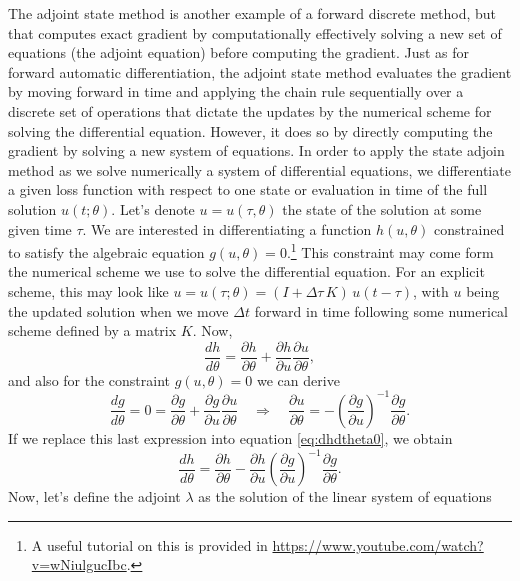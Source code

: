 The adjoint state method is another example of a forward discrete method, but that computes exact gradient by computationally effectively solving a new set of equations (the adjoint equation) before computing the gradient.
Just as for forward automatic differentiation, the adjoint state method evaluates the gradient by moving forward in time and applying the chain rule sequentially over a discrete set of operations that dictate the updates by the numerical scheme for solving the differential equation. However, it does so by directly computing the gradient by solving a new system of equations.
In order to apply the state adjoin method as we solve numerically a system of differential equations, we differentiate
a given loss function with respect to one state or evaluation in time of the full solution $u(t;\theta)$. Let's denote $u = u(\tau, \theta)$ the state of the solution at some given time $\tau$. We are interested in differentiating a function $h(u, \theta)$ constrained to satisfy the algebraic equation $g(u, \theta)=0$.\footnote{A useful tutorial on this is provided in \url{https://www.youtube.com/watch?v=wNiulgucIbc}.}
This constraint may come form the numerical scheme we use to solve the differential equation. For an explicit scheme, this may look like $u = u(\tau; \theta) = (I + \Delta \tau \, K) \, u(t - \tau)$, with $u$ being the updated solution when we move $\Delta t$ forward in time following some numerical scheme defined by a matrix $K$. Now,
\begin{equation}
 \frac{dh}{d\theta} = \frac{\partial h}{\partial \theta} + \frac{\partial h }{\partial u} \frac{\partial u}{\partial \theta},
 \label{eq:dhdtheta0}
\end{equation}
and also for the constraint $g(u, \theta)=0$ we can derive
\begin{equation}
 \frac{dg}{d\theta} = 0 = \frac{\partial g}{\partial \theta} + \frac{\partial g}{\partial u} \frac{\partial u}{\partial \theta}
 \quad \Rightarrow \quad
 \frac{\partial u}{\partial \theta} = - \left( \frac{\partial g}{\partial u} \right)^{-1} \frac{\partial g}{\partial \theta}.
\end{equation}
If we replace this last expression into equation \eqref{eq:dhdtheta0}, we obtain
\begin{equation}
 \frac{dh}{d\theta} 
 =
 \frac{\partial h}{\partial \theta} - \frac{\partial h}{\partial u} \left( \frac{\partial g}{\partial u} \right)^{-1} \frac{\partial g}{\partial \theta}.
    \label{eq:dhdtheta}
\end{equation}
Now, let's define the adjoint $\lambda$ as the solution of the linear system of equations 

